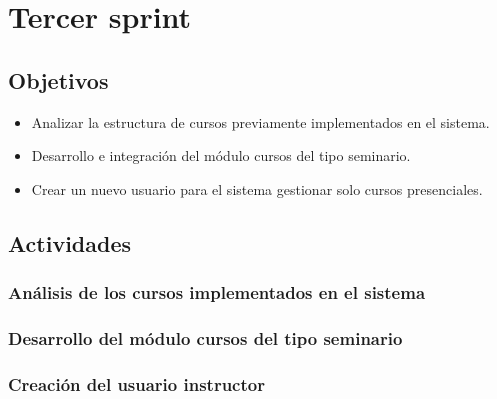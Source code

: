 ﻿\section{Tercer sprint} %
\label{sec:tercer_sprint}

\subsection{Objetivos}

\begin{itemize}
	\item Analizar la estructura de cursos previamente implementados en el sistema.
	\item Desarrollo e integración del módulo cursos del tipo seminario.
	\item Crear un nuevo usuario para el sistema gestionar solo cursos presenciales.
\end{itemize}

\subsection{Actividades} %
\label{sub:actividades3}

\subsubsection{Análisis de los cursos implementados en el sistema}


\subsubsection{Desarrollo del módulo cursos del tipo seminario}


\subsubsection{Creación del usuario instructor}



